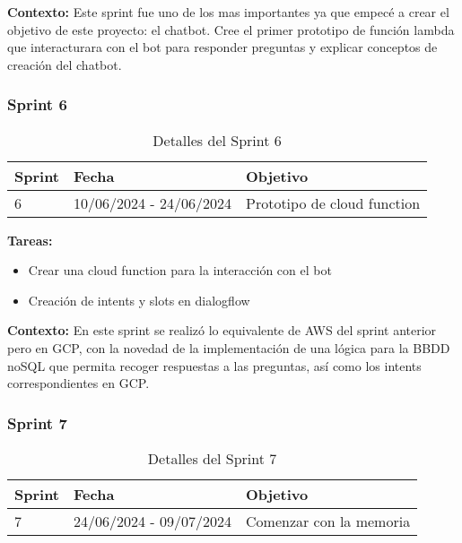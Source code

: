 \textbf{Contexto:} Este sprint fue uno de los mas importantes ya que empecé a crear
el objetivo de este proyecto: el chatbot. Cree el primer prototipo de función lambda
que interacturara con el bot para responder preguntas y explicar conceptos de creación
del chatbot.

\subsubsection{Sprint 6}

\begin{table}[h]
	\centering
	\begin{tabularx}
		{\textwidth}{l X X} \toprule \textbf{Sprint} & \textbf{Fecha} & \textbf{Objetivo}
		\\ \midrule 6 & 10/06/2024 - 24/06/2024 & Prototipo de cloud function \\ \bottomrule
	\end{tabularx}
	\caption{Detalles del Sprint 6}
	\label{tab:sprint6}
\end{table}

\textbf{Tareas:}
\begin{itemize}
	\item Crear una cloud function para la interacción con el bot

	\item Creación de intents y slots en dialogflow
\end{itemize}

\textbf{Contexto:} En este sprint se realizó lo equivalente de AWS del sprint
anterior pero en GCP, con la novedad de la implementación de una lógica para la BBDD
noSQL que permita recoger respuestas a las preguntas, así como los intents
correspondientes en GCP.

\subsubsection{Sprint 7}

\begin{table}[h]
	\centering
	\begin{tabularx}
		{\textwidth}{l X X} \toprule \textbf{Sprint} & \textbf{Fecha} & \textbf{Objetivo}
		\\ \midrule 7 & 24/06/2024 - 09/07/2024 & Comenzar con la memoria \\ \bottomrule
	\end{tabularx}
	\caption{Detalles del Sprint 7}
	\label{tab:sprint7}
\end{table}

